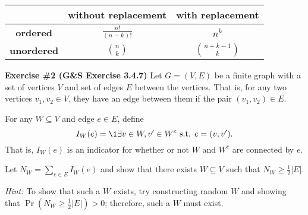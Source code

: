 \begin{table}[h!]
    \centering
    \begin{tabular}{|c|c|c|}
    \hline
     & \textbf{without replacement} & \textbf{with replacement} \\ \hline
    \textbf{ordered} & $\frac{n!}{(n-k)!}$ & $n^k$ \\ \hline
    \textbf{unordered} & $\binom{n}{k}$ & $\binom{n+k-1}{k}$ \\ \hline
    \end{tabular}
\end{table}
    

\begin{tcolorbox}
    \textbf{Exercise \#2 (G\&S Exercise 3.4.7)}
    Let $G = (V,E)$ be a finite graph with a set of vertices $V$ and set of edges $E$ between the vertices.
    That is, for any two vertices $v_1,v_2 \in V$, they have an edge between them if the pair $(v_1,v_2) \in E$.

    For any $W \subseteq V$ and edge $e \in E$, define 
    \[ 
        I_W(e) = \1{ \exists v \in W, v' \in W^c \text{ s.t. } e = (v,v') }.
    \]
    That is, $I_W(e)$ is an indicator for whether or not $W$ and $W^c$ are connected by $e$.

    Let $N_W = \sum_{e \in E} I_W(e)$ and show that there exists $W \subseteq V$ such that 
    $N_W \geq \frac{1}{2} |E|$.

    \textit{Hint: } To show that such a $W$ exists, try constructing random $W$ and showing that 
                  $\Pr \left( N_W \geq \frac{1}{2} |E| \right) > 0$; therefore, such a $W$ must exist.
    
\end{tcolorbox}

